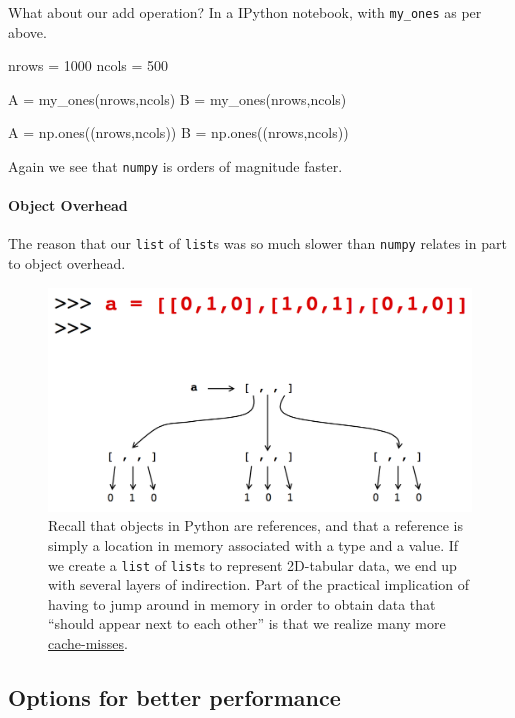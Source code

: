 \documentclass[12pt,letterpaper,twoside]{article}
\begin{document}
What about our add operation? In a IPython notebook, with \texttt{my\_ones} as per above.

\begin{python}[basicstyle=\footnotesize]
nrows = 1000
ncols = 500

A = my_ones(nrows,ncols)
B = my_ones(nrows,ncols)

A = np.ones((nrows,ncols))
B = np.ones((nrows,ncols))
\end{python}

Again we see that \texttt{numpy} is orders of magnitude faster.

\paragraph{Object Overhead} The reason that our \texttt{list} of
\texttt{list}s was so much slower than \texttt{numpy} relates in part
to object overhead.

\begin{figure}[h]
\centering
\includegraphics[scale=0.45]{fig/object-overhead.png}
\caption{Recall that objects in Python are references, and that a
  reference is simply a location in memory associated with a type and
  a value. If we create a \texttt{list} of \texttt{list}s to represent
  2D-tabular data, we end up with several layers of indirection. Part
  of the practical implication of having to jump around in memory in
  order to obtain data that ``should appear next to each other'' is
  that we realize many more
  \href{https://en.wikipedia.org/wiki/CPU_cache\#Cache_miss}{cache-misses}.}
\end{figure}

\subsection{Options for better performance}
\end{document}

